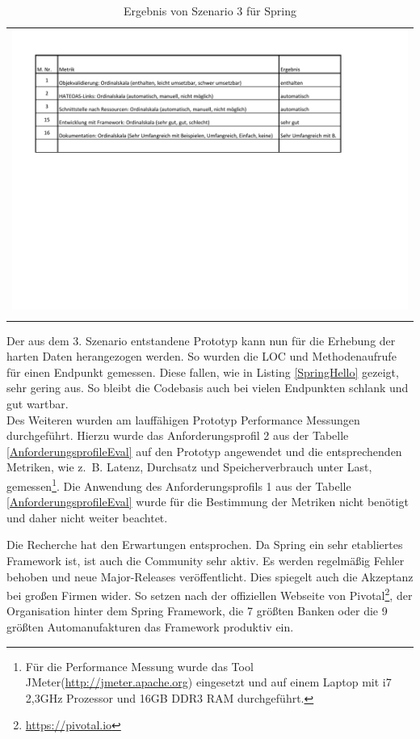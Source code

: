 \begin{longtable}{c}
	\includegraphics[width=\linewidth]{Bilder/Sz3ErgebnisSpring.pdf} \\	
	\caption[Szenario 3 Ergebnis Spring]{Ergebnis von Szenario 3 für Spring}
	\label{Sz3ErgebnisSpring}\\
\end{longtable}
\FloatBarrier

Der aus dem 3. Szenario entstandene Prototyp kann nun für die Erhebung der harten Daten herangezogen werden. So wurden die \ac{LOC} und Methodenaufrufe für einen Endpunkt gemessen. Diese fallen, wie in Listing \ref{SpringHello} gezeigt, sehr gering aus. So bleibt die Codebasis auch bei vielen Endpunkten schlank und gut wartbar.\\
Des Weiteren wurden am lauffähigen Prototyp Performance Messungen durchgeführt. Hierzu wurde das Anforderungsprofil 2 aus der Tabelle \ref{AnforderungsprofileEval} auf den Prototyp angewendet und die entsprechenden Metriken, wie z.~B. Latenz, Durchsatz und Speicherverbrauch unter Last, gemessen\footnote{Für die Performance Messung wurde das Tool JMeter(\url{http://jmeter.apache.org}) eingesetzt und auf einem Laptop mit i7 2,3GHz Prozessor und 16GB DDR3 RAM durchgeführt.}. Die Anwendung des Anforderungsprofils 1 aus der Tabelle \ref{AnforderungsprofileEval} wurde für die Bestimmung der Metriken nicht benötigt und daher nicht weiter beachtet.

Die Recherche hat den Erwartungen entsprochen. Da Spring ein sehr etabliertes Framework ist, ist auch die Community sehr aktiv. Es werden regelmäßig Fehler behoben und neue Major-Releases veröffentlicht. Dies spiegelt auch die Akzeptanz bei großen Firmen wider. So setzen nach der offiziellen Webseite von Pivotal\footnote{\url{https://pivotal.io}}, der Organisation hinter dem Spring Framework, die 7 größten Banken oder die 9 größten Automanufakturen das Framework produktiv ein.


